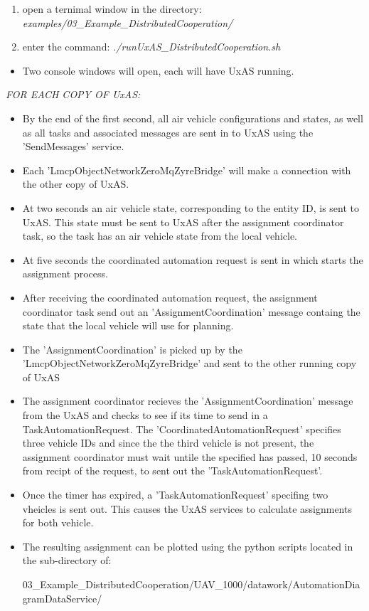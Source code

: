 \begin{enumerate}
\item open a ternimal window in the directory: \textit{examples/03\_Example\_DistributedCooperation/}
\item enter the command: \textit{./runUxAS\_DistributedCooperation.sh}
\end{enumerate}

\begin{itemize}
\item Two console windows will open, each will have UxAS running.
\end{itemize} 
\textit{FOR EACH COPY OF UxAS:}
\begin{itemize}
\item By the end of the first second, all air vehicle configurations and states, as well as all tasks and associated messages are sent in to UxAS using the 'SendMessages' service.
\item Each 'LmcpObjectNetworkZeroMqZyreBridge' will make a connection with the other copy of UxAS.
\item At two seconds an air vehicle state, corresponding to the entity ID, is sent to UxAS. This state must be sent to UxAS after the assignment coordinator task, so the task has an air vehicle state from the local vehicle.
\item At five seconds the coordinated automation request is sent in which starts the assignment process.
\item After receiving the coordinated automation request, the assignment coordinator task send out an 'AssignmentCoordination' message containg the state that the local vehicle will use for planning.
\item The 'AssignmentCoordination' is picked up by the 'LmcpObjectNetworkZeroMqZyreBridge' and sent to the other running copy of UxAS
\item The assignment coordinator recieves the 'AssignmentCoordination' message from the UxAS and checks to see if its time to send in a TaskAutomationRequest. The 'CoordinatedAutomationRequest' specifies three vehicle IDs and since the the third vehicle is not present, the assignment coordinator must wait untile the specified has passed, 10 seconds from recipt of the request, to sent out the 'TaskAutomationRequest'.
\item Once the timer has expired, a 'TaskAutomationRequest' specifing two vheicles is sent out. This causes the UxAS services to calculate assignments for both vehicle.
\item The resulting assignment can be plotted using the python scripts located in the sub-directory of:
\begin{docspec}
03\_Example\_DistributedCooperation/UAV\_1000/datawork/AutomationDiagramDataService/
\end{docspec}
\end{itemize} 

